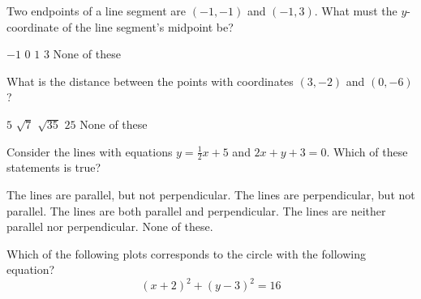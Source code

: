 \documentclass[12pt]{exam}
\newcommand{\<}{\langle}
\renewcommand{\>}{\rangle}
\begin{document}
\begin{questions}

\setcounter{question}{0}
\question[15]
Two endpoints of a line segment are \((-1,-1)\) and \((-1,3)\).
What must the \(y\)-coordinate of the line segment's midpoint be?


\begin{checkboxes}
\choice \(-1\)
\choice \(0\)
\choice \(1\)
\choice \(3\)
\choice None of these
\end{checkboxes}

\vfill

\question[15]
What is the distance between the points with coordinates \((3,-2)\)
and \((0,-6)\)?

\begin{checkboxes}
\choice \(5\)
\choice \(\sqrt{7}\)
\choice \(\sqrt{35}\)
\choice \(25\)
\choice None of these
\end{checkboxes}

\vfill

\question[15]
Consider the lines with equations \(y=\frac{1}{2}x+5\) and \(2x+y+3=0\).
Which of these statements is true?

\begin{checkboxes}
\choice The lines are parallel, but not perpendicular.
\choice The lines are perpendicular, but not parallel.
\choice The lines are both parallel and perpendicular.
\choice The lines are neither parallel nor perpendicular.
\choice None of these.
\end{checkboxes}

\vfill
\newpage

\question[15]
Which of the following plots corresponds to the circle with the following equation?
\[(x+2)^2+(y-3)^2=16\]

\begin{multicols}{2}
\begin{checkboxes}

  \choice


\end{checkboxes}
\end{multicols}
\end{questions}
\end{document}
